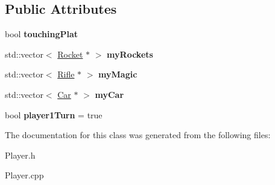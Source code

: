\subsection*{Public Attributes}
\begin{DoxyCompactItemize}
\item 
bool {\bfseries touching\+Plat}\hypertarget{class_player_a57e7fbcbfc41e6db6cf79e68d9eccbe9}{}\label{class_player_a57e7fbcbfc41e6db6cf79e68d9eccbe9}

\item 
std\+::vector$<$ \hyperlink{class_rocket}{Rocket} $\ast$ $>$ {\bfseries my\+Rockets}\hypertarget{class_player_a7b96da2c862f1f10af8846a3c83ed39b}{}\label{class_player_a7b96da2c862f1f10af8846a3c83ed39b}

\item 
std\+::vector$<$ \hyperlink{class_rifle}{Rifle} $\ast$ $>$ {\bfseries my\+Magic}\hypertarget{class_player_aa86a3e6007e3e838307f8815b895b232}{}\label{class_player_aa86a3e6007e3e838307f8815b895b232}

\item 
std\+::vector$<$ \hyperlink{class_car}{Car} $\ast$ $>$ {\bfseries my\+Car}\hypertarget{class_player_a397c1737aba76551622d100605cd70d3}{}\label{class_player_a397c1737aba76551622d100605cd70d3}

\item 
bool {\bfseries player1\+Turn} = true\hypertarget{class_player_aafb0b3c75387c7eef2b0588fa27c97c5}{}\label{class_player_aafb0b3c75387c7eef2b0588fa27c97c5}

\end{DoxyCompactItemize}


The documentation for this class was generated from the following files\+:\begin{DoxyCompactItemize}
\item 
Player.\+h\item 
Player.\+cpp\end{DoxyCompactItemize}
